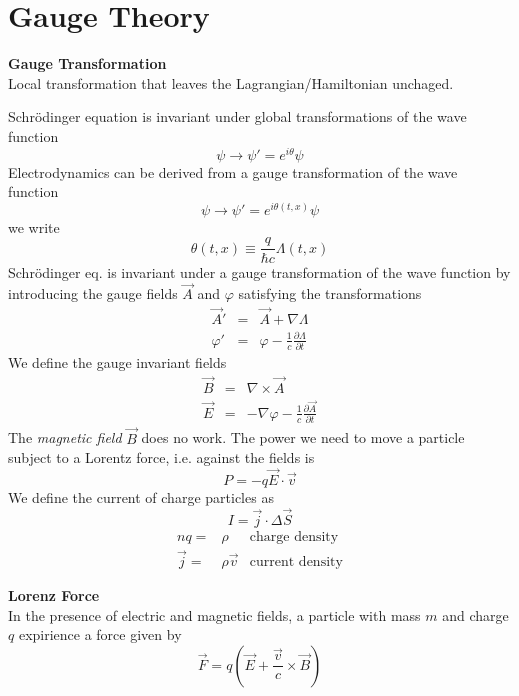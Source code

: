 \documentclass[12pt,a4paper]{article}
\author{José Antonio}
\begin{document}
\section{Gauge Theory}
\textbf{Gauge Transformation}\\
Local transformation that leaves the Lagrangian/Hamiltonian unchaged.

Schrödinger equation is invariant under global transformations of the wave function
\begin{equation}
	\psi \rightarrow \psi'=e^{i\theta}\psi
\end{equation} 
Electrodynamics can be derived from a gauge transformation of the wave function
\begin{equation}
	\psi \rightarrow \psi'=e^{i\theta(t,x)}\psi
\end{equation} 
we write
\begin{equation}
	\theta(t,x) \equiv \frac{q}{\hbar c}\Lambda(t,x)
\end{equation}
Schrödinger eq. is invariant under a gauge transformation of the wave function by introducing the gauge fields $\vec{A}$ and $\varphi$ satisfying the transformations
\begin{eqnarray}
	\vec{A}' & = & \vec{A} + \nabla \Lambda \\
	\varphi' & = & \varphi - \frac{1}{c}\frac{\partial \Lambda}{\partial t}
\end{eqnarray}
We define the gauge invariant fields
\begin{eqnarray}
	\vec{B} & = & \nabla \times \vec{A} \\
	\vec{E} & = & - \nabla \varphi  - \frac{1}{c}\frac{\partial \vec{A}}{\partial t}
\end{eqnarray}
The \textit{magnetic field} $\vec{B}$ does no work. The power we need to move a particle subject to a Lorentz force, i.e. against the fields is
\begin{equation}
	P = -q\vec{E}\cdot \vec{v}
\end{equation}
We define the current of charge particles as
\begin{equation}
	I = \vec{j}\cdot \Delta \vec{S}
\end{equation}
\begin{eqnarray}
	 nq  = & \rho &  \text{charge density}\\\vec{j}  = & \rho \vec{v}  &  \text{current density}
\end{eqnarray}


\textbf{Lorenz Force}\\
In the presence of electric and magnetic fields, a particle with mass $m$ and charge $q$ expirience a force given by
\begin{equation}
	\vec{F} = q(\vec{E} + \frac{\vec{v}}{c}\times \vec{B})
\end{equation}
\end{document}
